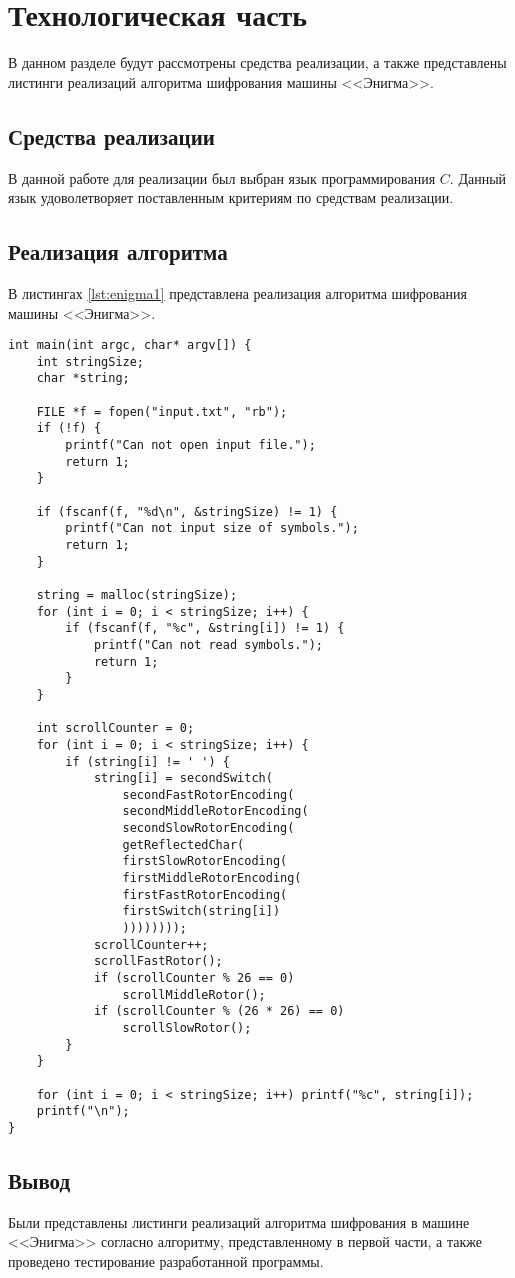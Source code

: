\chapter{Технологическая часть}

В данном разделе будут рассмотрены средства реализации, а также представлены листинги реализаций алгоритма шифрования машины <<Энигма>>.

\section{Средства реализации}
В данной работе для реализации был выбран язык программирования $C$. Данный язык удоволетворяет поставленным критериям по средствам реализации.

\section{Реализация алгоритма}

В листингах \ref{lst:enigma1} представлена реализация алгоритма шифрования машины <<Энигма>>.

\begin{center}
    \captionsetup{justification=raggedright,singlelinecheck=off}
    \begin{lstlisting}[label=lst:enigma1,caption=Реализация алгоритма шифрования машины <<Энигма>>]
int main(int argc, char* argv[]) { 
	int stringSize;
	char *string;

	FILE *f = fopen("input.txt", "rb");
	if (!f) {
		printf("Can not open input file.");
		return 1;
	}

	if (fscanf(f, "%d\n", &stringSize) != 1) {
		printf("Can not input size of symbols.");
		return 1;
	}
	
	string = malloc(stringSize); 
	for (int i = 0; i < stringSize; i++) {
		if (fscanf(f, "%c", &string[i]) != 1) {
			printf("Can not read symbols.");
			return 1;
		}
	}
	
	int scrollCounter = 0;
	for (int i = 0; i < stringSize; i++) {
		if (string[i] != ' ') {
			string[i] = secondSwitch(
				secondFastRotorEncoding(
				secondMiddleRotorEncoding(
				secondSlowRotorEncoding(
				getReflectedChar(
				firstSlowRotorEncoding(
				firstMiddleRotorEncoding(
				firstFastRotorEncoding(
				firstSwitch(string[i])
				)))))))); 
			scrollCounter++;
			scrollFastRotor();
			if (scrollCounter % 26 == 0)
				scrollMiddleRotor();
			if (scrollCounter % (26 * 26) == 0)
				scrollSlowRotor();
		}
	}

	for (int i = 0; i < stringSize; i++) printf("%c", string[i]);
	printf("\n");
}
\end{lstlisting}
\end{center}
\section*{Вывод}

Были представлены листинги реализаций алгоритма шифрования в машине <<Энигма>> согласно алгоритму, представленному в первой части, а также проведено тестирование разработанной программы.